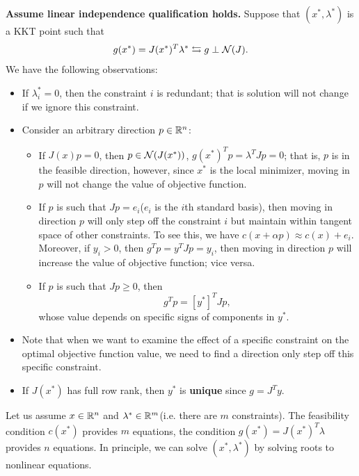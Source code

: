 \begin{refsection}
\begin{note}
\textbf{Assume linear independence qualification holds.}
Suppose that $(x^*,\lambda^*)$ is a KKT point such that
$$g(x^*) = J(x^*)^T\lambda^* \leftrightarrows g\perp \mathcal{N}(J).$$
We have the following observations:
\begin{itemize}
	\item If $\lambda^*_i = 0$, then the constraint $i$ is redundant; that is solution will not change if we ignore this constraint.
	\item Consider an arbitrary direction $p\in \mathbb{R}^n$:
	\begin{itemize}
		\item If $J(x)p = 0$, then $p\in \mathcal{N}(J(x^*))$, $g(x^*)^Tp = \lambda^TJp = 0$; that is, $p$ is in the feasible direction, however, since $x^*$ is the local minimizer, moving in $p$ will not change the value of objective function.
		\item If $p$ is such that $Jp = e_i$($e_i$ is the $i$th standard basis), then moving in direction $p$ will only step off the constraint $i$ but maintain within tangent space of other constraints. To see this, we have $c(x + \alpha p) \approx c(x) + e_i$. Moreover, if $y_i > 0$, then $g^Tp = y^TJp = y_i$, then moving in direction $p$ will increase the value of objective function; vice versa.
		\item If $p$ is such that $Jp \geq 0$, then $$g^Tp = [y^*]^TJp,$$
		whose value depends on specific signs of components in $y^*$.
	\end{itemize}
\item Note that when we want to examine the effect of a specific constraint on the optimal objective function value, we need to find a direction only step off this specific constraint.
\item If $J(x^*)$ has full row rank, then $y^*$ is \textbf{unique} since $g = J^Ty$.
\end{itemize}
\end{note}

\begin{remark}
Let us assume $x\in \mathbb{R}^n$ and $\lambda^*\in\mathbb{R}^m$(i.e. there are $m$ constraints). The feasibility condition $c(x^*)$ provides $m$ equations, the condition $g(x^*) = J(x^*)^T\lambda$ provides $n$ equations. In principle, we can solve $(x^*, \lambda^*)$ by solving roots to nonlinear equations.
\end{remark}




\end{refsection}
